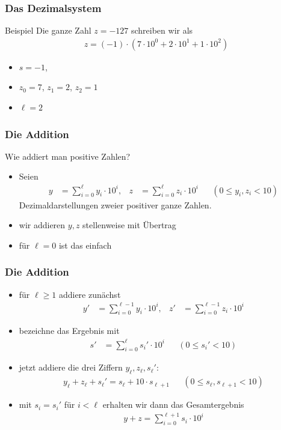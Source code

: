 \documentclass{beamer}
\newcommand\bc[1]{\left({#1}\right)}
\renewcommand{\ae}{\"a}
\newcommand{\ue}{\"u}
\newcommand{\Ue}{\"U}
\begin{document}
\begin{frame}\frametitle{Das Dezimalsystem}
\begin{block}{Beispiel}
Die ganze Zahl $z=-127$ schreiben wir als
	\begin{align*}
		z=(-1)\cdot\bc{7\cdot 10^0+2\cdot 10^1+1\cdot 10^2}
	\end{align*}
\begin{itemize}
\item $s=-1$,
\item $z_0=7$, $z_1=2$, $z_2=1$
\item $\ell=2$
\end{itemize}
\end{block}
\end{frame}

\begin{frame}\frametitle{Die Addition}
\begin{block}{Wie addiert man positive Zahlen?}
\begin{itemize}
\item Seien
	\begin{align*}
		y&=\sum_{i=0}^\ell y_i\cdot 10^i,&
		z&=\sum_{i=0}^\ell z_i\cdot 10^i&&(0\leq y_i,z_i<10)
	\end{align*}
	Dezimaldarstellungen zweier positiver ganze Zahlen.
\item wir addieren $y,z$ stellenweise mit \Ue bertrag
\item f\ue r $\ell=0$ ist das einfach
\end{itemize}
\end{block}
\end{frame}

\begin{frame}\frametitle{Die Addition}
\begin{itemize}
\item f\ue r $\ell\geq1$ addiere zun\ae chst
\begin{align*}
	y'&=\sum_{i=0}^{\ell-1} y_i\cdot 10^i,&
	z'&=\sum_{i=0}^{\ell-1} z_i\cdot 10^i
	\end{align*}
\item bezeichne das Ergebnis mit
	\begin{align*}
		s'&=\sum_{i=0}^\ell s_i'\cdot 10^i&&(0\leq s_i'<10)
	\end{align*}
\item jetzt addiere die drei Ziffern $y_\ell,z_\ell,s_\ell'$:
\begin{align*}
	y_\ell+z_\ell+s_\ell'=s_\ell+10\cdot s_{\ell+1}&&(0\leq s_\ell,s_{\ell+1}<10)
\end{align*}
\item mit $s_i=s_i'$ f\ue r $i<\ell$ erhalten wir dann das Gesamtergebnis
	\begin{align*}
		y+z=\sum_{i=0}^{\ell+1} s_i\cdot 10^i
	\end{align*}
\end{itemize}
\end{frame}
\end{document}
